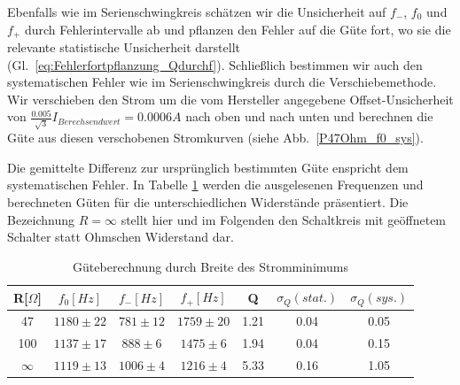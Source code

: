 \documentclass[12pt,a4paper]{article}
\begin{document}

Ebenfalls wie im Serienschwingkreis schätzen wir die Unsicherheit auf $f_-$, $f_0$ und $f_+$ durch Fehlerintervalle ab und pflanzen den Fehler auf die Güte fort, wo sie die relevante statistische Unsicherheit darstellt (Gl.~\eqref{eq:Fehlerfortpflanzung_Qdurchf}). Schließlich bestimmen wir auch den systematischen Fehler wie im Serienschwingkreis durch die Verschiebemethode. Wir verschieben den Strom um die vom Hersteller angegebene Offset-Unsicherheit von $\frac{0.005}{\sqrt{3}}I_{Berechsendwert}=0.0006A$ nach oben und nach unten und berechnen die Güte aus diesen verschobenen Stromkurven (siehe Abb.~\ref{P47Ohm_f0_sys}).

Die gemittelte Differenz zur ursprünglich bestimmten Güte enspricht dem systematischen Fehler. In Tabelle \ref{table:P_f0} werden die ausgelesenen Frequenzen und berechneten Güten für die unterschiedlichen Widerstände präsentiert. Die Bezeichnung $R=\infty$ stellt hier und im Folgenden den Schaltkreis mit geöffnetem Schalter statt Ohmschen Widerstand dar.
\begin{table}[H]
	\centering
	\begin{tabular}{|c|c|c|c|c|c|c|}
		\hline
		R[$\Omega$]&$f_0[Hz]$&$f_-[Hz]$&$f_+[Hz]$&Q&$\sigma_Q(stat.)$&$\sigma_Q(sys.)$\\
		\hline
		47&$1180\pm22$&$781\pm12$&$1759\pm20$&1.21&0.04&0.05\\
		100&$1137\pm17$&$888\pm6$&$1475\pm6$&1.94&0.04&0.15\\
		$\infty$&$1119\pm13$&$1006\pm4$&$1216\pm4$&5.33&0.16&1.05\\
		\hline		
	\end{tabular}
	\caption{Güteberechnung durch Breite des Stromminimums}
	\label{table:P_f0}
\end{table}
\end{document}
